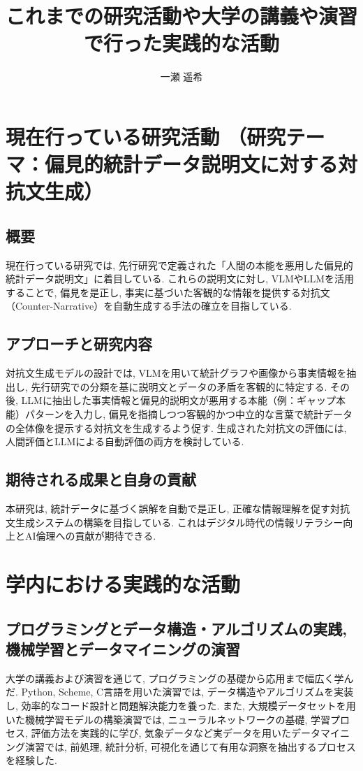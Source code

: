\documentclass[dvipdfmx]{jsarticle}
\makeatletter
\renewcommand{\maketitle}{
  \begin{center}
    {\Large\bfseries \@title \par}
    \vspace{0.1em}
    {\normalsize \@author \par}
  \end{center}
  \vspace{-0.5em}
}
\makeatother
\begin{document}
\title{これまでの研究活動や大学の講義や演習で行った実践的な活動}
\author{一瀬 遥希}
\date{}
\maketitle

\section{現在行っている研究活動 （研究テーマ：偏見的統計データ説明文に対する対抗文生成）}

\subsection{概要}
現在行っている研究では, 先行研究\cite{zhang2022}で定義された「人間の本能を悪用した偏見的統計データ説明文」に着目している.
これらの説明文に対し, VLMやLLMを活用することで, 偏見を是正し, 事実に基づいた客観的な情報を提供する対抗文（Counter-Narrative）を自動生成する手法の確立を目指している.

\subsection{アプローチと研究内容}
対抗文生成モデルの設計では, VLMを用いて統計グラフや画像から事実情報を抽出し, 先行研究での分類\cite{zhang2022,zhang2023}を基に説明文とデータの矛盾を客観的に特定する.
その後, LLMに抽出した事実情報と偏見的説明文が悪用する本能（例：ギャップ本能）パターンを入力し,
偏見を指摘しつつ客観的かつ中立的な言葉で統計データの全体像を提示する対抗文を生成するよう促す.
生成された対抗文の評価には, 人間評価とLLMによる自動評価の両方を検討している.

\subsection{期待される成果と自身の貢献}
本研究は, 統計データに基づく誤解を自動で是正し, 正確な情報理解を促す対抗文生成システムの構築を目指している.
これはデジタル時代の情報リテラシー向上とAI倫理への貢献が期待できる.

\section{学内における実践的な活動}

\subsection{プログラミングとデータ構造・アルゴリズムの実践, 機械学習とデータマイニングの演習}
大学の講義および演習を通じて, プログラミングの基礎から応用まで幅広く学んだ. Python, Scheme, C言語を用いた演習では, データ構造やアルゴリズムを実装し, 効率的なコード設計と問題解決能力を養った. また, 大規模データセットを用いた機械学習モデルの構築演習では, ニューラルネットワークの基礎, 学習プロセス, 評価方法を実践的に学び, 気象データなど実データを用いたデータマイニング演習では, 前処理, 統計分析, 可視化を通じて有用な洞察を抽出するプロセスを経験した.
\end{document}
